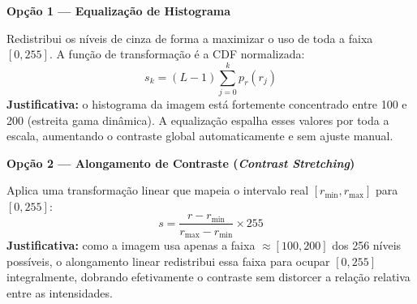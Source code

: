 \documentclass[12pt,a4paper,oneside,brazil]{abntex2}
\begin{document}
\begin{resposta}

\textbf{Op\c{c}\~ao 1 --- Equaliza\c{c}\~ao de Histograma}

Redistribui os n\'iveis de cinza de forma a maximizar o uso de toda a
faixa $[0, 255]$. A fun\c{c}\~ao de transforma\c{c}\~ao \'e a CDF
normalizada:
\[
  s_k = (L-1)\sum_{j=0}^{k} p_r(r_j)
\]
\textbf{Justificativa:} o histograma da imagem est\'a fortemente
concentrado entre 100 e 200 (estreita gama din\^amica). A equaliza\c{c}\~ao
espalha esses valores por toda a escala, aumentando o contraste global
automaticamente e sem ajuste manual.

\medskip
\textbf{Op\c{c}\~ao 2 --- Alongamento de Contraste
(\textit{Contrast Stretching})}

Aplica uma transforma\c{c}\~ao linear que mapeia o intervalo real
$[r_{\min}, r_{\max}]$ para $[0, 255]$:
\[
  s = \frac{r - r_{\min}}{r_{\max} - r_{\min}} \times 255
\]
\textbf{Justificativa:} como a imagem usa apenas a faixa $\approx
[100, 200]$ dos 256 n\'iveis poss\'iveis, o alongamento linear
redistribui essa faixa para ocupar $[0, 255]$ integralmente,
dobrando efetivamente o contraste sem distorcer a rela\c{c}\~ao relativa
entre as intensidades.

\end{resposta}

\begin{questao}[title=Quest\~ao 8 -- Equaliza\c{c}\~ao de Histograma (4\,bits\, $n{=}360$)]
\end{questao}
\end{document}
